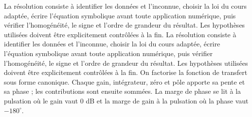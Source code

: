 \begin{corrigebox}[Corrigé]
La résolution consiste à identifier les données et l'inconnue, choisir la loi du cours adaptée, écrire l'équation symbolique avant toute application numérique, puis vérifier l'homogénéité, le signe et l'ordre de grandeur du résultat. Les hypothèses utilisées doivent être explicitement contrôlées à la fin.
La résolution consiste à identifier les données et l'inconnue, choisir la loi du cours adaptée, écrire l'équation symbolique avant toute application numérique, puis vérifier l'homogénéité, le signe et l'ordre de grandeur du résultat. Les hypothèses utilisées doivent être explicitement contrôlées à la fin.
On factorise la fonction de transfert sous forme canonique. Chaque gain, intégrateur, zéro et pôle apporte sa pente et sa phase ; les contributions sont ensuite sommées. La marge de phase se lit à la pulsation où le gain vaut $0$ dB et la marge de gain à la pulsation où la phase vaut $-180^\circ$.
\end{corrigebox}
